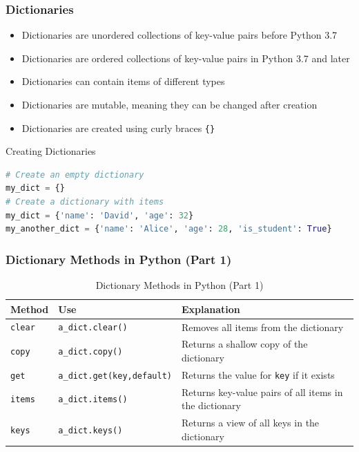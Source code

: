 \begin{frame}
    \frametitle{Dictionaries}
    \begin{itemize}
        \item Dictionaries are unordered collections of key-value pairs before Python 3.7
        \item Dictionaries are ordered collections of key-value pairs in Python 3.7 and later
        \item Dictionaries can contain items of different types
        \item Dictionaries are mutable, meaning they can be changed after creation
        \item Dictionaries are created using curly braces \texttt{\{\}}
    \end{itemize}
\end{frame}

\begin{frame}[fragile]{Creating Dictionaries}
    \begin{lstlisting}[language=Python]
# Create an empty dictionary
my_dict = {}
# Create a dictionary with items
my_dict = {'name': 'David', 'age': 32}
my_another_dict = {'name': 'Alice', 'age': 28, 'is_student': True}
    \end{lstlisting}
\end{frame} 

\begin{frame}
\frametitle{Dictionary Methods in Python (Part 1)}
\begin{table}[]
    \centering
    \begin{tabular}{|l|l|p{5cm}|}
        \hline
        \textbf{Method} & \textbf{Use} & \textbf{Explanation} \\ \hline
        \texttt{clear} & \texttt{a\_dict.clear()} & Removes all items from the dictionary \\ \hline
        \texttt{copy} & \texttt{a\_dict.copy()} & Returns a shallow copy of the dictionary \\ \hline
        \texttt{get} & \texttt{a\_dict.get(key,default)} & Returns the value for \texttt{key} if it exists \\ \hline
        \texttt{items} & \texttt{a\_dict.items()} & Returns key-value pairs of all items in the dictionary \\ \hline
        \texttt{keys} & \texttt{a\_dict.keys()} & Returns a view of all keys in the dictionary \\ \hline
    \end{tabular}
    \caption{Dictionary Methods in Python (Part 1)}
\end{table} 
\end{frame}

